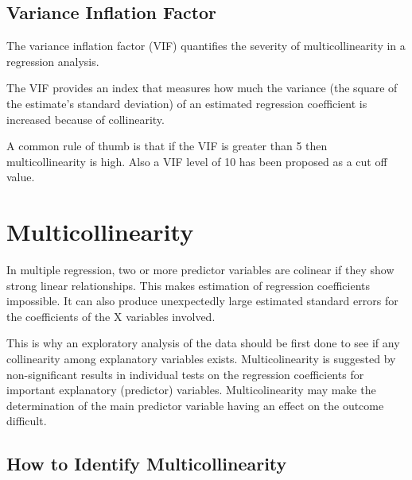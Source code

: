 \documentclass[12pt]{article}
\begin{document}
\subsection{Variance Inflation Factor}

The variance inflation factor (VIF) quantifies the severity of multicollinearity in a regression analysis.

The VIF provides an index that measures how much the variance (the square of the estimate's standard deviation) of an estimated regression coefficient is increased because of collinearity.


A common rule of thumb is that if the VIF is greater than 5 then multicollinearity is high. Also a VIF level of 10 has been proposed as a cut off value.

\newpage


\section{Multicollinearity}
In multiple regression, two or more predictor variables are colinear if they show strong linear relationships. This makes estimation of regression coefficients impossible. It can also produce unexpectedly large estimated standard errors for the coefficients of the X variables involved.

This is why an exploratory analysis of the data should be first done to see if any collinearity among explanatory variables exists. Multicolinearity is suggested by non-significant results in individual tests on the regression coefficients for important explanatory (predictor) variables. Multicolinearity may make the determination of the main predictor variable having an effect on the outcome difficult.

\subsection{How to Identify Multicollinearity}
\end{document}
